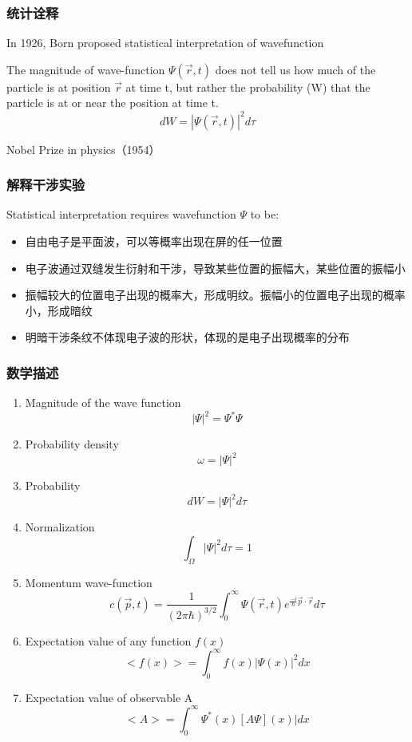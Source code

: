 \begin{frame}
    \frametitle{统计诠释}
    In 1926, Born proposed statistical interpretation of wavefunction
    \begin{tcolorbox}[colback=yellow!10,colframe=red!75!black,title=]
        The magnitude of wave-function $\Psi(\vec{r},t)$ does not tell us how much of 
        the particle is at position $\vec{r}$ at time t, 
        but rather the probability (W) that the particle is at or near the position at time t. \\
        \[ d W = |\Psi(\vec{r},t)|^2 d \tau \]
    \end{tcolorbox}
    {\color{deepred} Nobel Prize in physics（1954）}
\end{frame}

\begin{frame}
    \frametitle{解释干涉实验}
    Statistical interpretation requires wavefunction $\Psi$ to be:
    \begin{itemize}
        \item 自由电子是平面波，可以等概率出现在屏的任一位置
        \item 电子波通过双缝发生衍射和干涉，导致某些位置的振幅大，某些位置的振幅小
        \item 振幅较大的位置电子出现的概率大，形成明纹。振幅小的位置电子出现的概率小，形成暗纹
        \item 明暗干涉条纹不体现电子波的形状，体现的是电子出现概率的分布
    \end{itemize}  
\end{frame}

\begin{frame}[allowframebreaks=]
    \frametitle{数学描述}
    \begin{enumerate}
        \item Magnitude of the wave function \[|\Psi|^2 =\Psi^* \Psi \]
        \item Probability density \[\omega = |\Psi|^2 \]
        \item Probability  \[ d W = |\Psi|^2 d \tau \]
        \item Normalization \[ \int_{\Omega} |\Psi|^2 d \tau =1 \]
        \item Momentum wave-function \[ c(\vec{p},t)=\frac{1}{(2\pi\hbar)^{3/2}} \int_{0}^{\infty} \Psi(\vec{r},t) e^{\frac{-i}{\hbar} \vec{p}\cdot \vec{r} } d \tau \] 
        \item Expectation value of any function $f (x)$  \[ <f(x)>=\int_{0}^{\infty} f(x) |\Psi(x)|^2 dx \]
        \item Expectation value of observable A \[ <A>=\int_{0}^{\infty} \Psi^*(x) [A \Psi](x)| dx \]
    \end{enumerate}
\end{frame}

